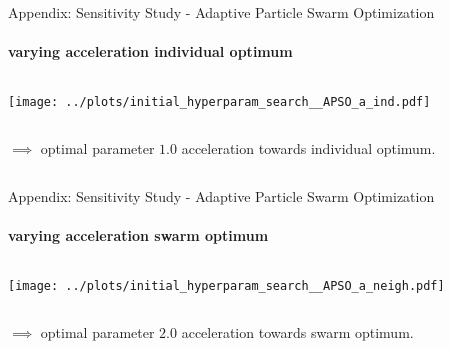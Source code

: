 \documentclass[11pt,aspectratio=169]{beamer}
\begin{document}
%
%

\begin{closingframe}{Appendix: Sensitivity Study - Adaptive Particle Swarm Optimization}
    \framesubtitle{varying \textbf{acceleration individual optimum}}

    \begin{columns}
    \begin{column}{0.8\textwidth}
        \texttt{[image: ../plots/initial\_hyperparam\_search\_\_APSO\_a\_ind.pdf]}
    \end{column}
    \end{columns}

    \begin{columns}
        \begin{column}{0.8\textwidth}
            $\implies$ optimal parameter $1.0$ acceleration towards individual optimum.
        \end{column}
        \begin{column}{0.1\textwidth}
            \tiny{}
        \end{column}
    \end{columns}
\end{closingframe}

%
%

\begin{closingframe}{Appendix: Sensitivity Study - Adaptive Particle Swarm Optimization}
    \framesubtitle{varying \textbf{acceleration swarm optimum}}

    \begin{columns}
    \begin{column}{0.8\textwidth}
        \texttt{[image: ../plots/initial\_hyperparam\_search\_\_APSO\_a\_neigh.pdf]}
    \end{column}
    \end{columns}

    \begin{columns}
        \begin{column}{0.8\textwidth}
            $\implies$ optimal parameter $2.0$ acceleration towards swarm optimum.
        \end{column}
        \begin{column}{0.1\textwidth}
            \tiny{}
        \end{column}
    \end{columns}
\end{closingframe}
\end{document}
